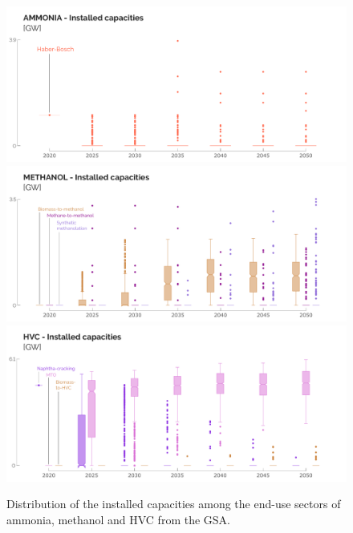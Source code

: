 \documentclass[11pt,twoside,a4paper,english]{article}
\begin{document}
\begin{appendices}
\begin{figure}[htbp!]
\centering
\includegraphics[width=\textwidth]{AMMONIA_Tech.pdf}
\includegraphics[width=\textwidth]{METHANOL_Tech.pdf}
\includegraphics[width=\textwidth]{HVC_Tech.pdf}
\caption{Distribution of the installed capacities among the end-use sectors of ammonia, methanol and \gls{HVC} from the \acrfull{GSA}.}
\label{fig:results_uq_tech_cap_NED}
\end{figure}


\end{appendices}
\end{document}
